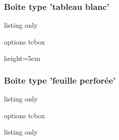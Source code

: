 \documentclass[french,11pt,a4paper]{article}
\begin{document}
\pagebreak

\subsubsection{Boîte type 'tableau blanc'}

\begin{DemoCode}{listing only}
\begin{tcboxwhiteboard}[clés]{options tcbox}
\end{tcboxwhiteboard}

\end{DemoCode}

\begin{DemoCode}{}
\begin{tcboxwhiteboard}{}
\lipsum[1][1-5]
\end{tcboxwhiteboard}

\medskip
\end{DemoCode}

\begin{DemoCode}{}
\begin{tcboxwhiteboard}%
  [border color=teal!25,alt color=red,width=\linewidth,bottom=false]%
  {height=5cm}
\lipsum[1][1-3]
\end{tcboxwhiteboard}

\medskip
\end{DemoCode}

\pagebreak

\subsubsection{Boîte type 'feuille perforée'}

\begin{DemoCode}{listing only}
\begin{tcboxnotebook}[clés]{options tcbox}
\end{tcboxnotebook}

\end{DemoCode}

\begin{DemoCode}{listing only}
\NewDocumentCommand{}
\end{DemoCode}
\end{document}
